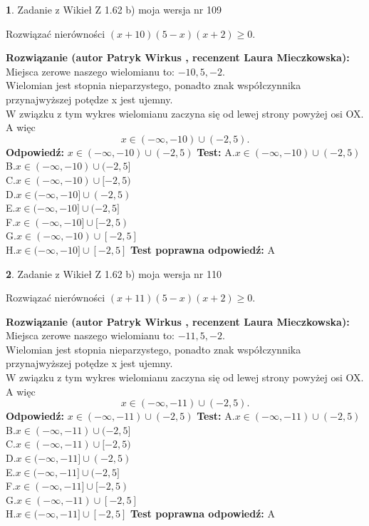 \documentclass[12pt, a4paper]{article}
\theoremstyle{definition} %
\newtheorem{zad}{}
\newcommand{\zadStart}[1]{\begin{zad}#1\newline}
\newcommand{\zadStop}{\end{zad}}
\newcommand{\rozwStart}[2]{\noindent \textbf{Rozwiązanie (autor #1 , recenzent #2): }\newline}
\newcommand{\rozwStop}{\newline}
\newcommand{\odpStart}{\noindent \textbf{Odpowiedź:}\newline}
\newcommand{\odpStop}{\newline}
\newcommand{\testStart}{\noindent \textbf{Test:}\newline}
\newcommand{\testStop}{\newline}
\newcommand{\kluczStart}{\noindent \textbf{Test poprawna odpowiedź:}\newline}
\newcommand{\kluczStop}{\newline}
\begin{document}
\zadStart{Zadanie z Wikieł Z 1.62 b) moja wersja nr 109}

Rozwiązać nierówności $(x+10)(5-x)(x+2)\ge0$.
\zadStop
\rozwStart{Patryk Wirkus}{Laura Mieczkowska}
Miejsca zerowe naszego wielomianu to: $-10, 5, -2$.\\
Wielomian jest stopnia nieparzystego, ponadto znak współczynnika przy\linebreak najwyższej potędze x jest ujemny.\\ W związku z tym wykres wielomianu zaczyna się od lewej strony powyżej osi OX. A więc $$x \in (-\infty,-10) \cup (-2,5).$$
\rozwStop
\odpStart
$x \in (-\infty,-10) \cup (-2,5)$
\odpStop
\testStart
A.$x \in (-\infty,-10) \cup (-2,5)$\\
B.$x \in (-\infty,-10) \cup (-2,5]$\\
C.$x \in (-\infty,-10) \cup [-2,5)$\\
D.$x \in (-\infty,-10] \cup (-2,5)$\\
E.$x \in (-\infty,-10] \cup (-2,5]$\\
F.$x \in (-\infty,-10] \cup [-2,5)$\\
G.$x \in (-\infty,-10) \cup [-2,5]$\\
H.$x \in (-\infty,-10] \cup [-2,5]$
\testStop
\kluczStart
A
\kluczStop



\zadStart{Zadanie z Wikieł Z 1.62 b) moja wersja nr 110}

Rozwiązać nierówności $(x+11)(5-x)(x+2)\ge0$.
\zadStop
\rozwStart{Patryk Wirkus}{Laura Mieczkowska}
Miejsca zerowe naszego wielomianu to: $-11, 5, -2$.\\
Wielomian jest stopnia nieparzystego, ponadto znak współczynnika przy\linebreak najwyższej potędze x jest ujemny.\\ W związku z tym wykres wielomianu zaczyna się od lewej strony powyżej osi OX. A więc $$x \in (-\infty,-11) \cup (-2,5).$$
\rozwStop
\odpStart
$x \in (-\infty,-11) \cup (-2,5)$
\odpStop
\testStart
A.$x \in (-\infty,-11) \cup (-2,5)$\\
B.$x \in (-\infty,-11) \cup (-2,5]$\\
C.$x \in (-\infty,-11) \cup [-2,5)$\\
D.$x \in (-\infty,-11] \cup (-2,5)$\\
E.$x \in (-\infty,-11] \cup (-2,5]$\\
F.$x \in (-\infty,-11] \cup [-2,5)$\\
G.$x \in (-\infty,-11) \cup [-2,5]$\\
H.$x \in (-\infty,-11] \cup [-2,5]$
\testStop
\kluczStart
A
\kluczStop
\end{document}
